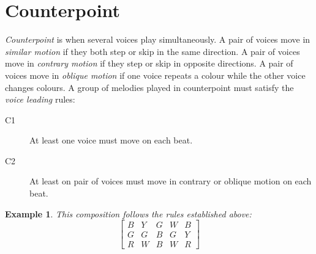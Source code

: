 \documentclass{scrartcl}
\newtheorem{example}{Example}
\begin{document}
\section{Counterpoint}
\emph{Counterpoint} is when several voices play simultaneously. A pair of voices move in \emph{similar motion} if they both step or skip in the same direction. A pair of voices move in \emph{contrary motion} if they step or skip in opposite directions.  A pair of voices move in \emph{oblique motion} if one voice repeats a colour while the other voice changes colours.  A group of melodies played in counterpoint must satisfy the \emph{voice leading} rules:
\begin{description}
	\item[C1] At least one voice must move on each beat.
	\item[C2] At least on pair of voices must move in contrary or oblique motion on each beat.
\end{description}

\begin{example}
This composition follows the rules established above:
\begin{equation}\nonumber
\begin{bmatrix}
	B & Y & G & W & B \\
	G & G & B & G & Y \\
	R & W & B & W & R
\end{bmatrix}
\end{equation}
\end{example}
\end{document}
